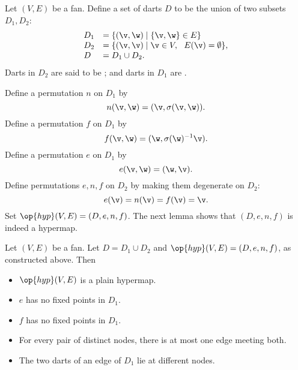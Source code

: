 Let $(V,E)$ be a fan.  Define a set of darts $D$ to be the union of
two subsets $D_1,D_2$:
\begin{displaymath}
\begin{array}{lll}
D_1 &= \{(\v,\w)\mid \{\v,\w\}\in E\}\\
D_2 &= \{(\v,\v) \mid \v\in V,\ \ E(\v) = \emptyset\},\\
D   &= D_1\cup D_2.
\end{array}
\end{displaymath}
Darts in $D_2$ are said to be ; and darts in
$D_1$ are .
%
%
%
%
%
%
%

Define a permutation $n$ on $D_1$ by
\begin{displaymath}n(\v,\w) = (\v,\sigma(\v,\w)).\end{displaymath}
Define a permutation $f$ on $D_1$ by
\begin{displaymath}
f (\v,\w) = (\w,\sigma(\w)^{-1} \v).
\end{displaymath}
Define a permutation $e$ on $D_1$ by
\begin{displaymath}
e (\v,\w) = (\w,\v).
\end{displaymath}
Define permutations $e,n,f$ on $D_2$ by making them degenerate on $D_2$:
\begin{displaymath}
e (\v) = n(\v) = f(\v) = \v.
\end{displaymath}
Set %
$\op{hyp}(V,E)=(D,e,n,f)$. %
The next lemma shows that $(D,e,n,f)$ is indeed a hypermap.



\begin{lemma}[]\label{lemma:fan-plain}
Let $(V,E)$ be a fan.  Let $D = D_1\cup D_2$
and $\op{hyp}(V,E) = (D,e,n,f)$, as constructed above.  Then
\begin{itemize}
\item $\op{hyp}(V,E)$ is a plain hypermap.
\item  $e$ has no fixed
points in $D_1$.
\item  $f$ has no fixed points in $D_1$.
\item For every pair of distinct nodes, there is at most one
edge meeting both.
\item The two darts of an edge of $D_1$ lie at different nodes.
\end{itemize}
%
\end{lemma}

